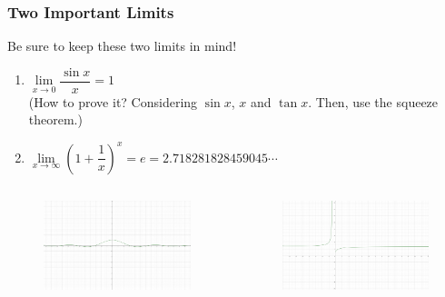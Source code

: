 	\begin{frame}
		\frametitle{Two Important Limits}
		Be sure to keep these two limits in mind!
		\begin{enumerate}
			\item $\lim\limits_{\textit{x} \to 0}\dfrac{\sin{x}}{x} = 1$\\
				(How to prove it? Considering $\sin{x}$, $x$ and $\tan{x}$. Then, use the squeeze theorem.)
			\item $\lim\limits_{\textit{x} \to \infty}(1 + \dfrac{1}{x})^{x} = e = 2.718281828459045\cdots$
		\end{enumerate}
		\begin{columns}[c] %
			\begin{column}{0.5\textwidth} %
				\begin{figure}
					\includegraphics[width=1\linewidth]{res/bbb.jpg}
				\end{figure}
			\end{column}
			\begin{column}{0.5\textwidth} %
				\begin{figure}
					\includegraphics[width=1\linewidth]{res/aaa.jpg}
				\end{figure}
			\end{column}
	\end{columns}
	\end{frame}


